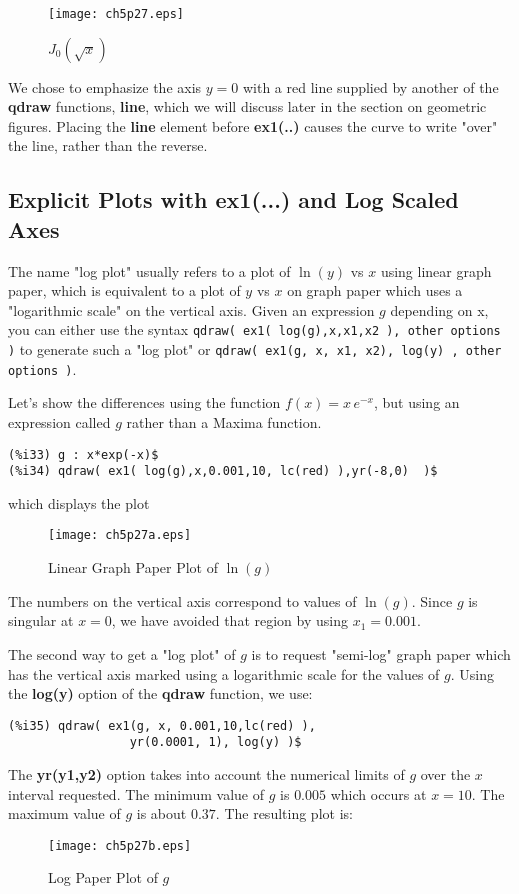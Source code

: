 \documentclass[12pt]{article}
\begin{document}
\begin{figure} [h]
   \centerline{\texttt{[image: ch5p27.eps]} }
	\caption{$J_{0}(\sqrt{x} )$ }
\end{figure}      


We chose to emphasize the axis $y = 0$ with a red line supplied by
  another of the \textbf{qdraw} functions, \textbf{line}, which we will
  discuss later in the section on geometric figures.
Placing the \textbf{line} element before \textbf{ex1(..)} causes the
  curve to write "over" the line, rather than the reverse.
  
\newpage
\subsection{Explicit Plots with ex1(...) and Log Scaled Axes}
The name "log plot" usually refers to a plot of $\ln(y)$ vs $x$ using linear
  graph paper, which is equivalent to a plot of $y$ vs $x$ on graph paper
  which uses a "logarithmic scale" on the vertical axis.
Given an expression $g$ depending on x, you can either use   
  the syntax \verb|qdraw( ex1( log(g),x,x1,x2 ), other options )| to generate such a "log plot"
  or \verb|qdraw( ex1(g, x, x1, x2), log(y) , other options )|.

\smallskip
  
Let's show the differences using the function $f(x) = x\,e^{-x}$, but
  using an expression called $g$ rather than a Maxima function.  
\small
\begin{verbatim}
(%i33) g : x*exp(-x)$
(%i34) qdraw( ex1( log(g),x,0.001,10, lc(red) ),yr(-8,0)  )$
\end{verbatim}
\normalsize
which displays the plot
\begin{figure} [h]
   \centerline{\texttt{[image: ch5p27a.eps]} }
	\caption{Linear Graph Paper Plot of $\ln(g)$ }
\end{figure}      

\smallskip
The numbers on the vertical axis correspond to values of $\ln(g)$.
Since $g$ is singular at $x = 0$, we have avoided that region by using
  $x_{1} = 0.001$.

\smallskip
The second way to get a "log plot" of $g$ is to request "semi-log" graph paper
  which has the vertical axis marked using a logarithmic scale for the values of $g$.
Using the \textbf{log(y)} option of the \textbf{qdraw} function, we use:
\small
\begin{verbatim}
(%i35) qdraw( ex1(g, x, 0.001,10,lc(red) ),
                 yr(0.0001, 1), log(y) )$
\end{verbatim}
\normalsize
The \textbf{yr(y1,y2)} option takes into account the numerical limits of
  $g$ over the $x$ interval requested.
The minimum value of $g$ is $0.005$ which occurs at $x = 10$.
The maximum value of $g$ is about $0.37$.
The resulting plot is:
\begin{figure} [h]
   \centerline{\texttt{[image: ch5p27b.eps]} }
	\caption{Log Paper Plot of $g$ }
\end{figure}      
  
\end{document}
